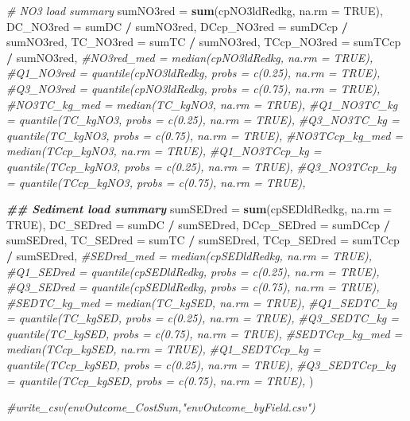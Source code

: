 \documentclass[
]{article}
\newenvironment{Shaded}{\begin{snugshade}}{\end{snugshade}}
\newcommand{\AttributeTok}[1]{\textcolor[rgb]{0.13,0.29,0.53}{#1}}
\newcommand{\CommentTok}[1]{\textcolor[rgb]{0.56,0.35,0.01}{\textit{#1}}}
\newcommand{\ConstantTok}[1]{\textcolor[rgb]{0.56,0.35,0.01}{#1}}
\newcommand{\DocumentationTok}[1]{\textcolor[rgb]{0.56,0.35,0.01}{\textbf{\textit{#1}}}}
\newcommand{\FunctionTok}[1]{\textcolor[rgb]{0.13,0.29,0.53}{\textbf{#1}}}
\newcommand{\NormalTok}[1]{#1}
\newcommand{\SpecialCharTok}[1]{\textcolor[rgb]{0.81,0.36,0.00}{\textbf{#1}}}
\begin{document}
\begin{Shaded}
\begin{Highlighting}[]
            \CommentTok{\# NO3 load summary}
            \AttributeTok{sumNO3red =} \FunctionTok{sum}\NormalTok{(cpNO3ldRedkg, }\AttributeTok{na.rm =} \ConstantTok{TRUE}\NormalTok{),}
            \AttributeTok{DC\_NO3red =}\NormalTok{ sumDC }\SpecialCharTok{/}\NormalTok{ sumNO3red,}
            \AttributeTok{DCcp\_NO3red =}\NormalTok{ sumDCcp }\SpecialCharTok{/}\NormalTok{ sumNO3red,}
            \AttributeTok{TC\_NO3red =}\NormalTok{ sumTC }\SpecialCharTok{/}\NormalTok{ sumNO3red,}
            \AttributeTok{TCcp\_NO3red =}\NormalTok{ sumTCcp }\SpecialCharTok{/}\NormalTok{ sumNO3red,}
            \CommentTok{\#NO3red\_med = median(cpNO3ldRedkg, na.rm = TRUE),}
            \CommentTok{\#Q1\_NO3red = quantile(cpNO3ldRedkg, probs = c(0.25), na.rm = TRUE),}
            \CommentTok{\#Q3\_NO3red = quantile(cpNO3ldRedkg, probs = c(0.75), na.rm = TRUE),}
            \CommentTok{\#NO3TC\_kg\_med = median(TC\_kgNO3, na.rm = TRUE),}
            \CommentTok{\#Q1\_NO3TC\_kg = quantile(TC\_kgNO3, probs = c(0.25), na.rm = TRUE),}
            \CommentTok{\#Q3\_NO3TC\_kg = quantile(TC\_kgNO3, probs = c(0.75), na.rm = TRUE),}
            \CommentTok{\#NO3TCcp\_kg\_med = median(TCcp\_kgNO3, na.rm = TRUE),}
            \CommentTok{\#Q1\_NO3TCcp\_kg = quantile(TCcp\_kgNO3, probs = c(0.25), na.rm = TRUE),}
            \CommentTok{\#Q3\_NO3TCcp\_kg = quantile(TCcp\_kgNO3, probs = c(0.75), na.rm = TRUE),}
            
            \DocumentationTok{\#\# Sediment load summary}
            \AttributeTok{sumSEDred =} \FunctionTok{sum}\NormalTok{(cpSEDldRedkg, }\AttributeTok{na.rm =} \ConstantTok{TRUE}\NormalTok{),}
            \AttributeTok{DC\_SEDred =}\NormalTok{ sumDC }\SpecialCharTok{/}\NormalTok{ sumSEDred,}
            \AttributeTok{DCcp\_SEDred =}\NormalTok{ sumDCcp }\SpecialCharTok{/}\NormalTok{ sumSEDred,}
            \AttributeTok{TC\_SEDred =}\NormalTok{ sumTC }\SpecialCharTok{/}\NormalTok{ sumSEDred,}
            \AttributeTok{TCcp\_SEDred =}\NormalTok{ sumTCcp }\SpecialCharTok{/}\NormalTok{ sumSEDred,}
            \CommentTok{\#SEDred\_med = median(cpSEDldRedkg, na.rm = TRUE),}
            \CommentTok{\#Q1\_SEDred = quantile(cpSEDldRedkg, probs = c(0.25), na.rm = TRUE),}
            \CommentTok{\#Q3\_SEDred = quantile(cpSEDldRedkg, probs = c(0.75), na.rm = TRUE),}
            \CommentTok{\#SEDTC\_kg\_med = median(TC\_kgSED, na.rm = TRUE),}
            \CommentTok{\#Q1\_SEDTC\_kg = quantile(TC\_kgSED, probs = c(0.25), na.rm = TRUE),}
            \CommentTok{\#Q3\_SEDTC\_kg = quantile(TC\_kgSED, probs = c(0.75), na.rm = TRUE),}
            \CommentTok{\#SEDTCcp\_kg\_med = median(TCcp\_kgSED, na.rm = TRUE),}
            \CommentTok{\#Q1\_SEDTCcp\_kg = quantile(TCcp\_kgSED, probs = c(0.25), na.rm = TRUE),}
            \CommentTok{\#Q3\_SEDTCcp\_kg = quantile(TCcp\_kgSED, probs = c(0.75), na.rm = TRUE),}
\NormalTok{            )}

\CommentTok{\#write\_csv(envOutcome\_CostSum,"envOutcome\_byField.csv")}
\end{Highlighting}
\end{Shaded}
\end{document}
